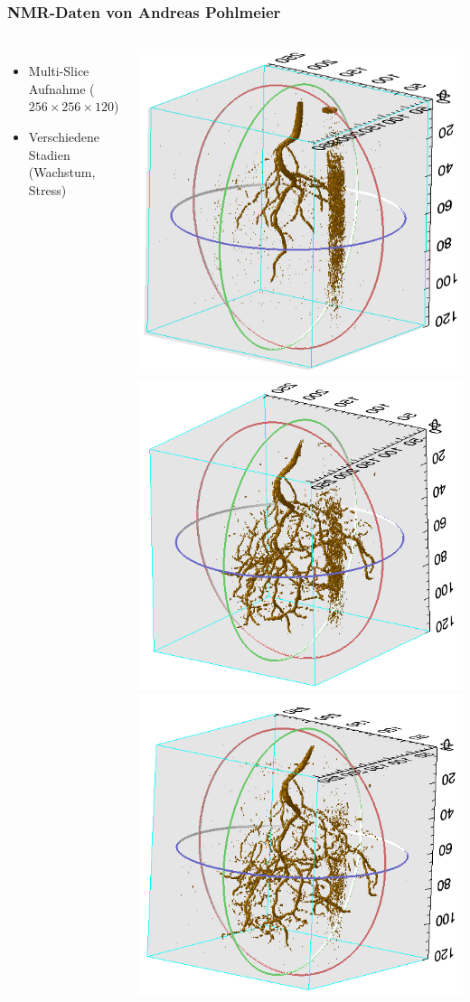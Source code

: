 \documentclass[final,ngerman,ignorenonframetext,compress]{beamer}
\begin{document}
\begin{frame}
	\frametitle{NMR-Daten von Andreas Pohlmeier}
	\begin{columns}
		\begin{itemize}
			\item Multi-Slice Aufnahme ($256\times256\times120$)
			\item Verschiedene Stadien (Wachstum, Stress)
		\end{itemize}
		\vspace{1cm}

		\includegraphics[width=.6\linewidth]{img/d1}
		\includegraphics[width=.6\linewidth]{img/d2}\\
		\includegraphics[width=.6\linewidth]{img/d3}
	\end{columns}
\end{frame}
\end{document}
